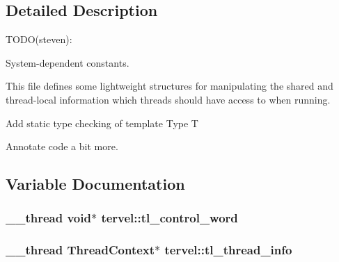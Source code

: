 \subsection{Detailed Description}
T\+O\+D\+O(steven)\+: 

System-\/dependent constants.

This file defines some lightweight structures for manipulating the shared and thread-\/local information which threads should have access to when running.

Add static type checking of template Type T

Annotate code a bit more. 

\subsection{Variable Documentation}
\hypertarget{namespacetervel_a1270a409d1f2adfb02a9665f95203f2b}{}
\subsubsection[{tl\+\_\+control\+\_\+word}]{\setlength{\rightskip}{0pt plus 5cm}\+\_\+\+\_\+thread void$\ast$ tervel\+::tl\+\_\+control\+\_\+word}\label{namespacetervel_a1270a409d1f2adfb02a9665f95203f2b}
\hypertarget{namespacetervel_a60b23602adbb2dee6160af411b74bfd3}{}
\subsubsection[{tl\+\_\+thread\+\_\+info}]{\setlength{\rightskip}{0pt plus 5cm}\+\_\+\+\_\+thread {\bf Thread\+Context}$\ast$ tervel\+::tl\+\_\+thread\+\_\+info}\label{namespacetervel_a60b23602adbb2dee6160af411b74bfd3}
